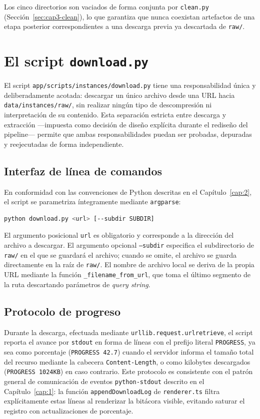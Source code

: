Los cinco directorios son vaciados de forma conjunta por
\texttt{clean.py} (Secci\'on~\ref{sec:cap3-clean}), lo que garantiza que
nunca coexistan artefactos de una etapa posterior correspondientes a una
descarga previa ya descartada de \texttt{raw/}.

\section{El script \texttt{download.py}}
\label{sec:cap3-download}

El script \texttt{app/scripts/instances/download.py} tiene una
responsabilidad \'unica y deliberadamente acotada: descargar un \'unico
archivo desde una URL hacia \texttt{data/instances/raw/}, sin realizar
ning\'un tipo de descompresi\'on ni interpretaci\'on de su contenido. Esta
separaci\'on estricta entre descarga y extracci\'on —impuesta como decisi\'on
de dise\~no expl\'icita durante el redise\~no del pipeline— permite que
ambas responsabilidades puedan ser probadas, depuradas y reejecutadas de
forma independiente.

\subsection{Interfaz de l\'inea de comandos}

En conformidad con las convenciones de Python descritas en el
Cap\'itulo~\ref{cap:2}, el script se parametriza \'integramente mediante
\texttt{argparse}:

\begin{lstlisting}[language=bash]
python download.py <url> [--subdir SUBDIR]
\end{lstlisting}

El argumento posicional \texttt{url} es obligatorio y corresponde a la
direcci\'on del archivo a descargar. El argumento opcional \texttt{--subdir}
especifica el subdirectorio de \texttt{raw/} en el que se guardar\'a el
archivo; cuando se omite, el archivo se guarda directamente en la ra\'iz de
\texttt{raw/}. El nombre de archivo local se deriva de la propia URL
mediante la funci\'on \texttt{\_filename\_from\_url}, que toma el \'ultimo
segmento de la ruta descartando par\'ametros de \emph{query string}.

\subsection{Protocolo de progreso}

Durante la descarga, efectuada mediante \texttt{urllib.request.urlretrieve},
el script reporta el avance por \texttt{stdout} en forma de l\'ineas con el
prefijo literal \texttt{PROGRESS}, ya sea como porcentaje
(\texttt{PROGRESS 42.7}) cuando el servidor informa el tama\~no total del
recurso mediante la cabecera \texttt{Content-Length}, o como kilobytes
descargados (\texttt{PROGRESS 1024KB}) en caso contrario. Este protocolo es
consistente con el patr\'on general de comunicaci\'on de eventos
\texttt{python-stdout} descrito en el Cap\'itulo~\ref{cap:1}: la funci\'on
\texttt{appendDownloadLog} de \texttt{renderer.ts} filtra expl\'icitamente
estas l\'ineas al renderizar la bit\'acora visible, evitando saturar el
registro con actualizaciones de porcentaje.

